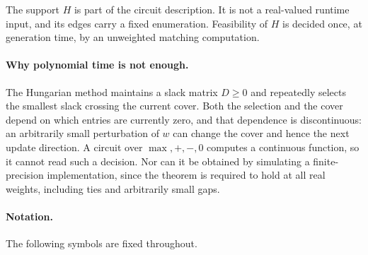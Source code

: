 \documentclass[11pt]{article}
\begin{document}
The support $H$ is part of the circuit description.  It is not a real-valued
runtime input, and its edges carry a fixed enumeration.  Feasibility of $H$ is
decided once, at generation time, by an unweighted matching computation.

\paragraph{Why polynomial time is not enough.}
The Hungarian method maintains a slack matrix $D\ge0$ and repeatedly selects the
smallest slack crossing the current cover.  Both the selection and the cover
depend on which entries are currently zero, and that dependence is
discontinuous: an arbitrarily small perturbation of $w$ can change the cover and
hence the next update direction.  A circuit over $\max,+,-,0$ computes a
continuous function, so it cannot read such a decision.  Nor can it be obtained
by simulating a finite-precision implementation, since the theorem is required
to hold at all real weights, including ties and arbitrarily small gaps.

\paragraph{Notation.}
The following symbols are fixed throughout.
\end{document}
